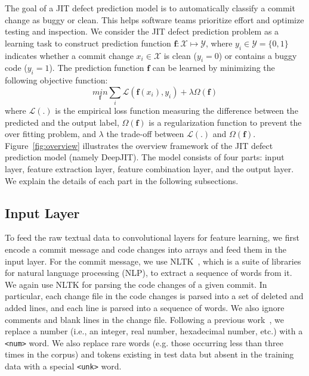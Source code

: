 The goal of a JIT defect prediction model is to automatically classify a commit change as buggy or clean. This helps software teams prioritize effort and optimize testing and inspection. We consider the JIT defect prediction problem as a learning task to construct prediction function $\textbf{f}:
\mathcal{X} \longmapsto \mathcal{Y}$, where $y_i \in \mathcal{Y} = \{0, 1\}$ indicates whether a commit change $x_i \in \mathcal{X}$ is clean ($y_i = 0$) or contains a buggy code ($y_i = 1$). The prediction function $\textbf{f}$ can be learned by minimizing the following objective function:
\begin{equation}
\underset{\textbf{f}}{min} \sum_{i}\mathcal{L}(\textbf{f}(x_i), y_i) + \lambda\Omega(\textbf{f})
\end{equation}
where $\mathcal{L}(.)$ is the empirical loss function measuring the difference between the predicted and the output label, $\Omega(\textbf{f})$ is a regularization function to prevent the over fitting problem, and $\lambda$ the trade-off between $\mathcal{L}(.)$ and $\Omega(\textbf{f})$. Figure~\ref{fig:overview} illustrates the overview framework of the JIT defect prediction model (namely DeepJIT). The model consists of four parts: input layer, feature extraction layer, feature combination layer, and the output layer. We explain the details of each part in the following subsections.

\subsection{Input Layer}
\label{sec:input_layer}
To feed the raw textual data to convolutional layers for feature learning, we first encode a commit message and code changes into arrays and feed them in the input layer. For the commit message, we use NLTK~\cite{bird2004nltk}, which is a suite of libraries for natural language processing (NLP), to extract a sequence of words from it. We again use NLTK for parsing the code changes of a given commit. In particular, each change file in the code changes is parsed into a set of deleted and added lines, and each line is parsed into a sequence of words. We also ignore comments and blank lines in the change file. Following a previous work~\cite{white2015toward}, we replace a number (i.e., an integer, real number, hexadecimal number, etc.) with a \texttt{<num>} word. We also replace rare words (e.g. those occurring less than three times in the corpus) and tokens existing in test data but absent in the training data with a special \texttt{<unk>} word.

